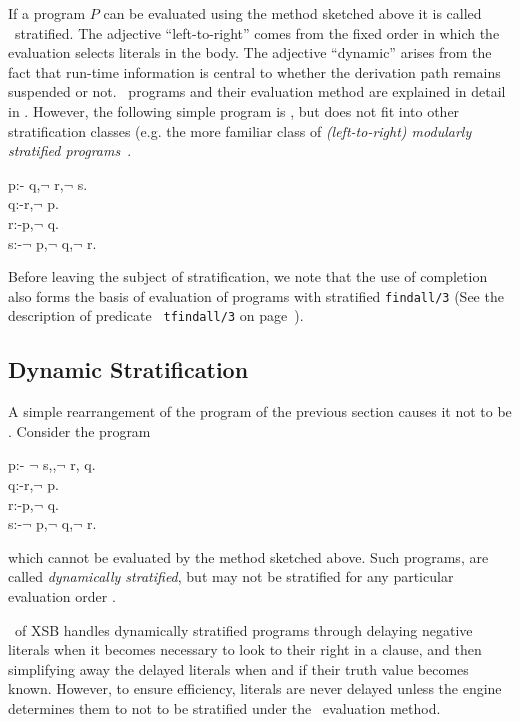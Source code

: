 If a program $P$ can be evaluated using the method sketched above it
is called \LRD\ stratified.  The adjective ``left-to-right'' comes
from the fixed order in which the evaluation selects literals in the
body.  The adjective ``dynamic'' arises from the fact that run-time
information is central to whether the derivation path remains
suspended or not.  \LRD\ programs and their evaluation method are
explained in detail in \cite{SaSW95a,Przy89d}.  However, the following
simple program is \LRD, but does not fit into other stratification
classes (e.g. the more familiar class of {\em (left-to-right)
modularly stratified programs}~\cite{Ross91}.
\begin{center}
\begin{Prog}
p:- q,$\neg$ r,$\neg$ s.\\
q:-r,$\neg$ p. \\ 
r:-p,$\neg$ q. \\
s:-$\neg$ p,$\neg$ q,$\neg$ r. \\
\end{Prog} 
\end{center}

Before leaving the subject of stratification, we note that the use of
completion also forms the basis of evaluation of programs with
stratified {\tt findall/3} (See the description of predicate {\tt
tfindall/3} on page~\pageref{tfindall/3}).

\subsection{Dynamic Stratification}

A simple rearrangement of the program of the previous section causes
it not to be \LRD.  Consider the program
\begin{center}
\begin{Prog}
p:- $\neg$ s,,$\neg$ r, q.\\
q:-r,$\neg$ p. \\ 
r:-p,$\neg$ q. \\
s:-$\neg$ p,$\neg$ q,$\neg$ r. \\
\end{Prog}   
\end{center}
which cannot be evaluated by the method sketched above.  Such
programs, are called {\em dynamically stratified}, but may not be
stratified for any particular evaluation order \cite{Przy89d}.

\version\ of XSB handles dynamically stratified programs through
delaying negative literals when it becomes necessary to look to their
right in a clause, and then simplifying away the delayed literals when
and if their truth value becomes known.  However, to ensure
efficiency, literals are never delayed unless the engine determines
them to not to be stratified under the \LRD\ evaluation method.

